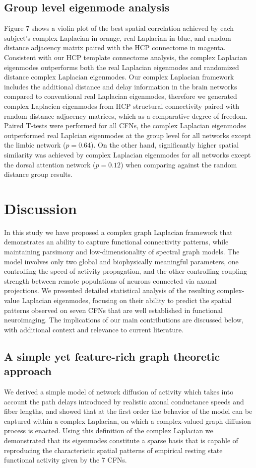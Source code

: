 \documentclass{article}
\begin{document}
\subsection{Group level eigenmode analysis}
Figure 7 shows a violin plot of the best spatial correlation achieved by each subject's complex Laplacian in orange, real Laplacian in blue, and random distance adjacency matrix paired with the HCP connectome in magenta. Consistent  with our HCP template connectome analysis, the complex Laplacian eigenmodes outperforms both the real Laplacian eigenmodes and randomized distance complex Laplacian eigenmodes. Our complex Laplacian framework includes the additional distance and delay information in the brain networks compared to conventional real Laplacian eigenmodes, therefore we generated complex Laplacien eigenmodes from HCP structural connectivity paired with random distance adjacency matrices, which as a comparative degree of freedom. Paired T-tests were performed for all CFNs, the complex Laplacian eigenmodes outperformed real Laplcian eigenmodes at the group level for all networks except the limbic network ($p=0.64$). On the other hand, significantly higher spatial similarity was achieved by complex Laplacian eigenmodes for all networks except the dorsal attention network ($p=0.12$) when comparing against the random distance group results.

\section{Discussion}

In this study we have proposed a complex graph Laplacian framework that demonstrates an ability to capture functional connectivity patterns, while maintaining parsimony and low-dimensionality of spectral graph models. The model involves only two global and biophysically meaningful parameters, one controlling the speed of activity propagation, and the other controlling coupling strength between remote populations of neurons connected via axonal projections. We presented detailed statistical analysis of the resulting complex-value Laplacian eigenmodes, focusing on their ability to predict the spatial patterns observed on seven CFNs that are well established in functional neuroimaging. The implications of our main contributions are discussed below, with additional context and relevance to current literature.

\subsection{A simple yet feature-rich graph theoretic approach}
We derived a simple model of network diffusion of activity which takes into account the path delays introduced by realistic axonal conductance speeds and fiber lengths, and showed that at the first order the behavior of the model can be captured within a complex Laplacian, on which a complex-valued graph diffusion process is enacted. Using this definition of the complex Laplacian we demonstrated that its eigenmodes constitute a sparse basis that is capable of reproducing the characteristic spatial patterns of empirical resting state functional activity given by the 7 CFNs.
\end{document}
